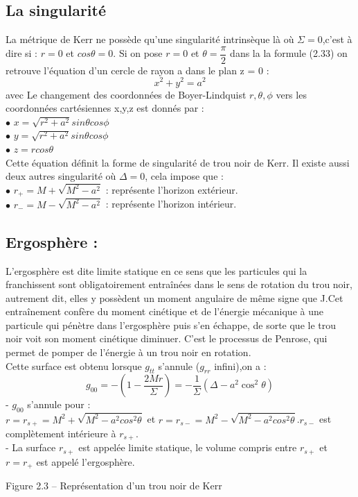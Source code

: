 \subsection*{La singularité}
La métrique de Kerr ne possède qu’une singularité intrinsèque là où $ \Sigma= 0$,c'est à dire si : $r = 0$ et $ cos\theta = 0$.
Si on pose $r = 0$ et $\theta =\dfrac{\pi}{2}  $ dans la la formule (2.33) on retrouve l’équation d’un cercle de rayon a dans le plan z = 0 :
\begin{equation}
x^{2} + y^{2} = a^{2}
\end{equation}
avec Le changement des coordonnées de Boyer-Lindquist $r,\theta,\phi$ vers les coordonnées cartésiennes x,y,z est donnés par :\\
$\bullet$ $x = \sqrt{r^{2}+a^{2}} sin\theta cos\phi$ \\
$\bullet$ $y = \sqrt{r^{2}+a^{2}}sin\theta cos\phi$ \\
$\bullet$ $z = rcos\theta$ \\
Cette équation définit la forme de singularité de trou noir de Kerr. Il existe aussi deux autres
singularité où $\Delta = 0$, cela impose que :\\
$\bullet$ $r_{+}=M+\sqrt{M^{2}-a^{2}}$ : représente l’horizon extérieur.\\
$\bullet$ $r_{-}=M-\sqrt{M^{2}-a^{2}}$ : représente l’horizon intérieur.
\subsection*{Ergosphère :}
L'ergosphère est dite limite statique en ce sens que les particules qui la franchissent sont obligatoirement entraînées dans le sens de rotation du trou noir, autrement dit, elles y possèdent un moment angulaire de même signe que  J.Cet entraînement confère du moment cinétique et de l'énergie mécanique à une particule qui pénètre dans l'ergosphère puis s'en échappe, de sorte que le trou noir voit son moment cinétique diminuer. C'est le processus de Penrose, qui permet de pomper de l'énergie à un trou noir en rotation. \\
Cette surface est obtenu lorsque $g_{tt}$ s’annule ($g_{rr}$ infini),on a :\\
$$g_{00} = -(1 - \dfrac{2Mr}{\Sigma} ) = -\dfrac{1}{\Sigma}(\Delta - a^{2}\cos^{2}\theta)$$
- $g_{00}$ s’annule pour : \\
$r = r_{s+} = M^{2} + \sqrt{M^{2}-a^{2}cos^{2}\theta}$ et $r = r_{s-} = M^{2} -\sqrt{M^{2}-a^{2} cos^{2}\theta }$.$r_{s-}$ est complètement intérieure à $r_{s+}$.\\
- La surface $r_{s+}$ est appelée limite statique, le volume compris entre $r_{s+}$ et $ r = r_{+} $ est appelé l’ergosphère.
\begin{center}

\end{center}
Figure 2.3 – Représentation d’un trou noir de Kerr
